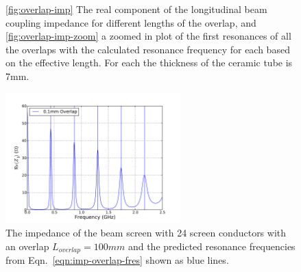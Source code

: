 \begin{figure}
\caption{\ref{fig:overlap-imp} The real component of the longitudinal beam coupling impedance for different lengths of the overlap, and \ref{fig:overlap-imp-zoom} a zoomed in plot of the first resonances of all the overlaps with the calculated resonance frequency for each based on the effective length. For each the thickness of the ceramic tube is 7mm.}
\label{fig:mki-overlap-imp-tot}
\end{figure}

\begin{figure}
\begin{center}
\includegraphics[width=0.6\textwidth]{LHC_MKI/figures/mki-overlap-fres-100mm.pdf}
\end{center}
\caption{The impedance of the beam screen with 24 screen conductors with an overlap $L_{overlap}=100mm$ and the predicted resonance frequencies from Eqn.~\ref{eqn:imp-overlap-fres} shown as blue lines.}
\label{fig:imp-overlap-fres}
\end{figure}

